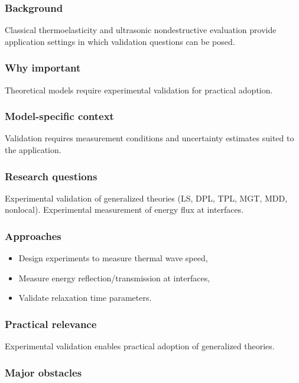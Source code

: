 \subsubsection{Background}

Classical thermoelasticity and ultrasonic nondestructive evaluation provide application settings in which validation questions can be posed.

\subsubsection{Why important}

Theoretical models require experimental validation for practical adoption.

\subsubsection{Model-specific context}

Validation requires measurement conditions and uncertainty estimates suited to the application.

\subsubsection{Research questions}

Experimental validation of generalized theories (LS, DPL, TPL, MGT, MDD, nonlocal). Experimental measurement of energy flux at interfaces.

\subsubsection{Approaches}

\begin{itemize}
\item Design experiments to measure thermal wave speed,
\item Measure energy reflection/transmission at interfaces,
\item Validate relaxation time parameters.
\end{itemize}

\subsubsection{Practical relevance}

Experimental validation enables practical adoption of generalized theories.

\subsubsection{Major obstacles}

